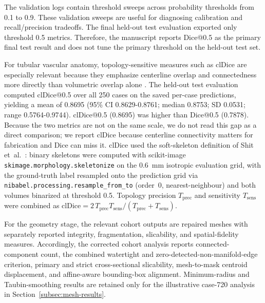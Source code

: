 \documentclass[anonymous]{iopjournal}
\begin{document}
The validation logs contain threshold sweeps across probability thresholds from 0.1 to 0.9. These validation sweeps are useful for diagnosing calibration and recall/precision tradeoffs. The final held-out test evaluation exported only threshold 0.5 metrics. Therefore, the manuscript reports Dice@0.5 as the primary final test result and does not tune the primary threshold on the held-out test set.

For tubular vascular anatomy, topology-sensitive measures such as clDice are especially relevant because they emphasize centerline overlap and connectedness more directly than volumetric overlap alone \cite{shit2021}. The held-out test evaluation computed clDice@0.5 over all 250 cases on the saved per-case predictions, yielding a mean of 0.8695 (95\% CI 0.8629-0.8761; median 0.8753; SD 0.0531; range 0.5764-0.9744). clDice@0.5 (0.8695) was higher than Dice@0.5 (0.7878). Because the two metrics are not on the same scale, we do not read this gap as a direct comparison; we report clDice because centerline connectivity matters for fabrication and Dice can miss it. clDice used the soft-skeleton definition of Shit et~al.~\cite{shit2021}: binary skeletons were computed with scikit-image \texttt{skimage.morphology.skeletonize} on the \SI{0.6}{mm} isotropic evaluation grid, with the ground-truth label resampled onto the prediction grid via \texttt{nibabel.processing.resample\_from\_to} (order~0, nearest-neighbour) and both volumes binarized at threshold 0.5. Topology precision $T_{\mathrm{prec}}$ and sensitivity $T_{\mathrm{sens}}$ were combined as $\mathrm{clDice}=2\,T_{\mathrm{prec}}T_{\mathrm{sens}}/(T_{\mathrm{prec}}+T_{\mathrm{sens}})$.

For the geometry stage, the relevant cohort outputs are repaired meshes with separately reported integrity, fragmentation, slicability, and spatial-fidelity measures. Accordingly, the corrected cohort analysis reports connected-component count, the combined watertight and zero-detected-non-manifold-edge criterion, primary and strict cross-sectional slicability, mesh-to-mask centroid displacement, and affine-aware bounding-box alignment. Minimum-radius and Taubin-smoothing results are retained only for the illustrative case-720 analysis in Section~\ref{subsec:mesh-results}.
\end{document}
